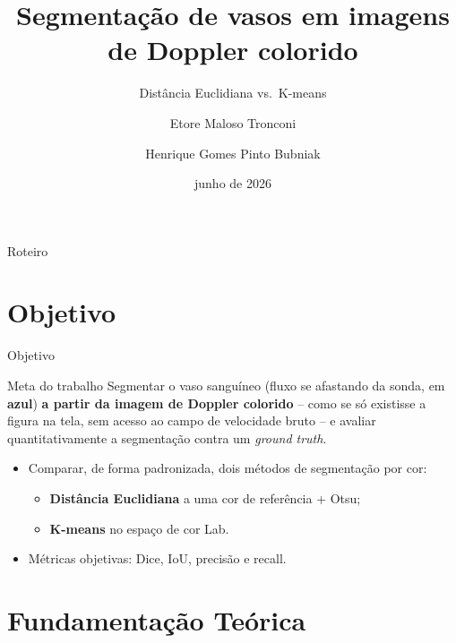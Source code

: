 \documentclass[aspectratio=169,11pt]{beamer}
\title[Segmentação em Doppler colorido]{Segmentação de vasos em imagens de Doppler colorido}
\subtitle{Distância Euclidiana vs.\ K-means}
\author[Tronconi; Bubniak]{Etore Maloso Tronconi \and Henrique Gomes Pinto Bubniak}
\institute[UTFPR]{IF69D / OPEET014 -- Processamento Digital de Imagens\\Prof.\ Gustavo B.\ Borba -- UTFPR}
\date{junho de 2026}
\begin{document}
\begin{frame}[plain]
  \titlepage
\end{frame}

\begin{frame}{Roteiro}
  \tableofcontents
\end{frame}

\section{Objetivo}
\begin{frame}{Objetivo}
  \begin{block}{Meta do trabalho}
    Segmentar o vaso sanguíneo (fluxo se afastando da sonda, em \textbf{azul})
    \textbf{a partir da imagem de Doppler colorido} -- como se só existisse a
    figura na tela, sem acesso ao campo de velocidade bruto -- e avaliar
    quantitativamente a segmentação contra um \emph{ground truth}.
  \end{block}
  \begin{itemize}
    \item Comparar, de forma padronizada, dois métodos de segmentação por cor:
      \begin{itemize}
        \item \textbf{Distância Euclidiana} a uma cor de referência + Otsu;
        \item \textbf{K-means} no espaço de cor Lab.
      \end{itemize}
    \item Métricas objetivas: Dice, IoU, precisão e recall.
  \end{itemize}
\end{frame}

\section{Fundamentação Teórica}
\end{document}
